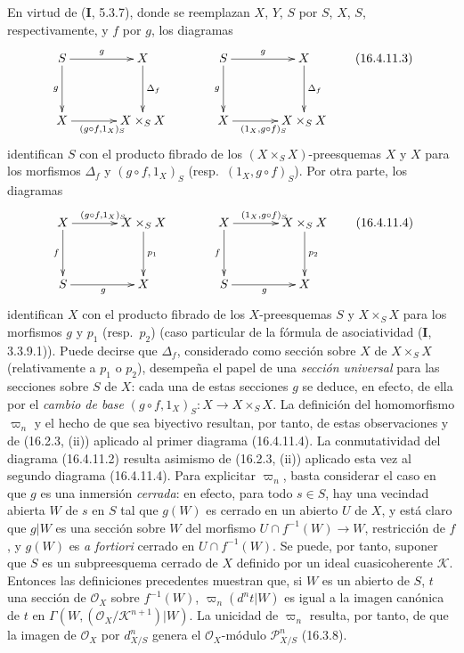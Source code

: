 En virtud de (\textbf I, 5.3.7), donde se reemplazan $X$, $Y$, $S$ por $S$, $X$, $S$,
respectivamente, y $f$ por $g$, los diagramas
\[
  \xymatrix@=3pc{
    S\ar[r]^-g\ar[d]_-g&X\ar[d]^-{\Delta_f}
      &S\ar[r]^-g\ar[d]_-g&X\ar[d]^-{\Delta_f}\\
    X\ar[r]_{(g\circ f,1_X)_S}&X\times_S X
      &X\ar[r]_{(1_X,g\circ f)_S}&X\times_S X
  }
  \tag{16.4.11.3}
  \label{IV.16.4.11.3}
\]
identifican $S$ con el producto fibrado de los $(X\times_S X)$-preesquemas $X$ y $X$ para los
morfismos $\Delta_f$ y $(g\circ f,1_X)_S$ (resp.\ $(1_X,g\circ f)_S$).
Por otra parte, los diagramas
\[
  \xymatrix@=3pc{
    X\ar[r]^{(g\circ f,1_X)_S}\ar[d]_-f&X\times_S X\ar[d]^-{p_1}
      &X\ar[r]^{(1_X,g\circ f)_S}\ar[d]_-f&X\times_S X\ar[d]^-{p_2}\\
    S\ar[r]_{g}&X&S\ar[r]_{g}&X
  }
  \tag{16.4.11.4}
  \label{IV.16.4.11.4}
\]
identifican $X$ con el producto fibrado de los $X$-preesquemas $S$ y $X\times_S X$ para los
morfismos $g$ y $p_1$ (resp.\ $p_2$) (caso particular de la fórmula
de asociatividad (\textbf I, 3.3.9.1)). Puede decirse que $\Delta_f$, considerado como
sección sobre $X$ de $X\times_S X$ (relativamente a $p_1$ o $p_2$), desempeña el papel
de una \emph{sección universal} para las secciones sobre $S$ de $X$: cada una de estas
secciones $g$ se deduce, en efecto, de ella por el \emph{cambio de base}
$(g\circ f,1_X)_S:X\to X\times_S X$. La definición del homomorfismo
$\varpi_n$ y el hecho de que sea biyectivo resultan, por tanto, de estas observaciones y de
(16.2.3, (ii)) aplicado al primer diagrama (16.4.11.4). La conmutatividad del
diagrama (16.4.11.2) resulta asimismo de (16.2.3, (ii)) aplicado esta vez al
segundo diagrama (16.4.11.4). Para explicitar $\varpi_n$, basta considerar el
caso en que $g$ es una inmersión \emph{cerrada}: en efecto, para todo $s\in S$, hay
una vecindad abierta $W$ de $s$ en $S$ tal que $g(W)$ es cerrado en un
abierto $U$ de $X$, y está claro que $g|W$ es una sección sobre $W$ del morfismo
$U\cap f^{-1}(W)\to W$, restricción de $f$, y $g(W)$ es \emph{a fortiori}
cerrado en $U\cap f^{-1}(W)$. Se puede, por tanto, suponer que $S$ es un
subpreesquema cerrado de $X$ definido por un ideal cuasicoherente $\mathscr{K}$.
Entonces las definiciones precedentes muestran que, si $W$ es un abierto de $S$,
$t$ una sección de $\mathcal{O}_X$ sobre $f^{-1}(W)$,
$\varpi_n(d^n t|W)$ es igual a la imagen canónica de $t$ en
$\Gamma(W,(\mathcal{O}_X/\mathscr{K}^{n+1})|W)$. La unicidad de $\varpi_n$
resulta, por tanto, de que la imagen de $\mathcal{O}_X$ por $d_{X/S}^n$ genera el
$\mathcal{O}_X$-módulo $\mathscr{P}_{X/S}^n$ (16.3.8).

